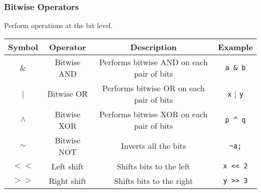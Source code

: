 \documentclass[11pt,A4]{article}
\begin{document}
            \subsubsection{Bitwise Operators}
            Perform operations at the bit level.
            \begin{table}[h]
                \centering
                \setlength{\arrayrulewidth}{0.3mm}
                \renewcommand{\arraystretch}{1.2}
                \begin{tabular}{cccc}
                    \toprule
                    Symbol & Operator & Description & Example \\
                    \midrule
                    \& & Bitwise AND & Performs bitwise AND on each pair of bits & \verb|a & b| \\
                    \arrayrulecolor{gray!50}\cmidrule(lr){1-4}\arrayrulecolor{black}
                    | & Bitwise OR & Performs bitwise OR on each pair of bits & \verb|x| | \verb|y| \\
                    \arrayrulecolor{gray!50}\cmidrule(lr){1-4}\arrayrulecolor{black}
                    $\wedge$ & Bitwise XOR & Performs bitwise XOR on each pair of bits & \verb|p ^ q| \\
                    \arrayrulecolor{gray!50}\cmidrule(lr){1-4}\arrayrulecolor{black}
                    $\sim$ & Bitwise NOT & Inverts all the bits & \verb|~a;| \\
                    \arrayrulecolor{gray!50}\cmidrule(lr){1-4}\arrayrulecolor{black}
                    $<<$ & Left shift & Shifts bits to the left & \verb|x << 2| \\
                    \arrayrulecolor{gray!50}\cmidrule(lr){1-4}\arrayrulecolor{black}
                    $>>$ & Right shift & Shifts bits to the right & \verb|y >> 3| \\
                    \bottomrule
                \end{tabular}
            \end{table} 
            
\end{document}
